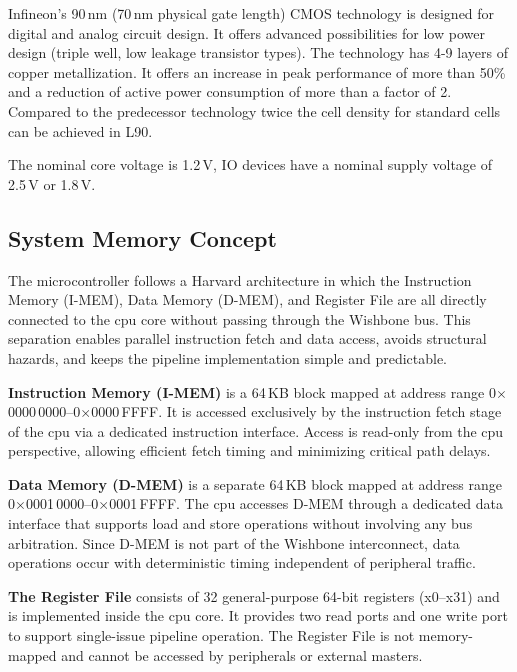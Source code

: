 \begin{itemize}
            Infineon’s 90\,nm (70\,nm physical gate length) CMOS technology is designed for
            digital and analog circuit design. It offers advanced possibilities for low
            power design (triple well, low leakage transistor types). The technology has
            4-9 layers of copper metallization. It offers an increase in peak performance
            of more than 50\% and a reduction of active power consumption of more than a
            factor of 2. Compared to the predecessor technology twice the cell density for
            standard cells can be achieved in L90.

            The nominal core voltage is 1.2\,V, IO devices have a nominal supply voltage of
            2.5\,V or 1.8\,V.

            \subsection{System Memory Concept}
            The microcontroller follows a \gls{Harvard} architecture in which the
            Instruction Memory (\gls{I-MEM}), Data Memory (\gls{D-MEM}), and Register File
            are all directly connected to the \gls{cpu} core without passing through the
            Wishbone bus. This separation enables parallel instruction fetch and data
            access, avoids structural hazards, and keeps the \gls{pipeline} implementation
            simple and predictable.

            \textbf{Instruction Memory (\gls{I-MEM})} is a 64\,KB block mapped at address range
            0$\times$0000\,0000–0$\times$0000\,FFFF. It is accessed exclusively by the instruction fetch stage of the \gls{cpu} via
            a dedicated instruction interface. Access is read-only from the \gls{cpu} perspective, allowing efficient
            fetch timing and minimizing critical path delays.

            \textbf{Data Memory (\gls{D-MEM})} is a separate 64\,KB block mapped at address range
            0$\times$0001\,0000–0$\times$0001\,FFFF. The \gls{cpu} accesses \gls{D-MEM} through a dedicated data interface that supports
            load and store operations without involving any bus arbitration. Since \gls{D-MEM} is not part of the
            Wishbone interconnect, data operations occur with deterministic timing independent of peripheral
            traffic.

            \textbf{The Register File} consists of 32 general-purpose 64-bit registers (x0–x31) and is implemented
            inside the \gls{cpu} core. It provides two read ports and one write port to support single-issue \gls{pipeline}
            operation. The Register File is not memory-mapped and cannot be accessed by peripherals or external
            masters.


\end{itemize}
